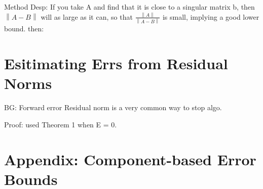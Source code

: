 \documentclass{article}
\begin{document}
\noindent
Method Desp: If you take A and find that it is close to a singular matrix b,
then $\left\lVert A-B\right\rVert $ will as large as it can, so that $\frac{\left\lVert A\right\rVert }{\left\lVert A-B\right\rVert }$
is small, implying a good lower bound.
then:\\

\section{Esitimating Errs from Residual Norms}
BG: Forward error
Residual norm is a very common way to stop algo.

Proof: used Theorem 1 when E = 0.


\section{Appendix: Component-based Error Bounds}
\end{document}
